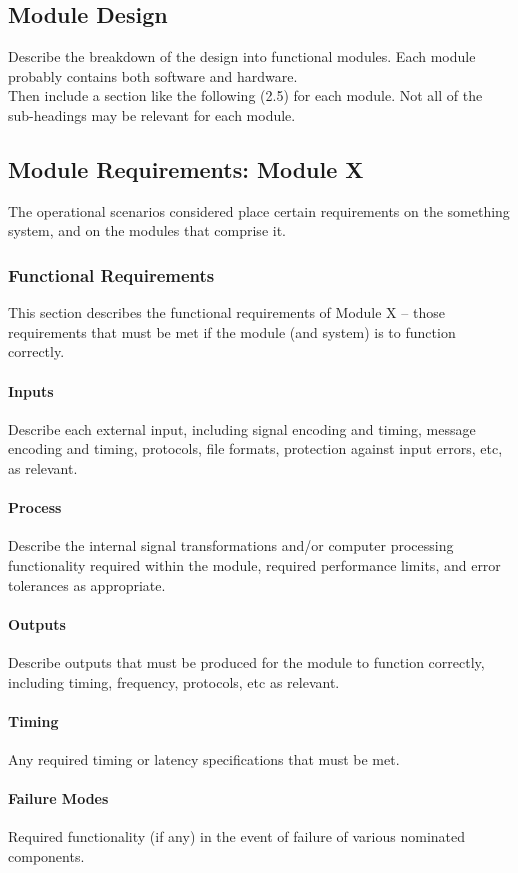 \documentclass[11pt,a4paper]{article}
\begin{document}
\subsection{Module Design}
Describe the breakdown of the design into functional modules. Each module probably contains both software and hardware.\\
Then include a section like the following (2.5) for each module. Not all of the sub-headings may be relevant for each module.




\subsection{Module Requirements: Module X}
The operational scenarios considered place certain requirements on the something system, and on the modules that comprise it.
\subsubsection{Functional Requirements}
This section describes the functional requirements of Module X – those requirements that must be met if the module (and system) is to function correctly.  

\paragraph{Inputs}
Describe each external input, including signal encoding and timing, message encoding and timing, protocols, file formats, protection against input errors, etc, as relevant.
\paragraph{Process}
Describe the internal signal transformations and/or computer processing functionality required within the module, required performance limits, and error tolerances as appropriate.
\paragraph{Outputs}
Describe outputs that must be produced for the module to function correctly, including timing, frequency, protocols, etc as relevant.
\paragraph{Timing}
Any required timing or latency specifications that must be met.
\paragraph{Failure Modes}
Required functionality (if any) in the event of failure of various nominated components.
\end{document}
